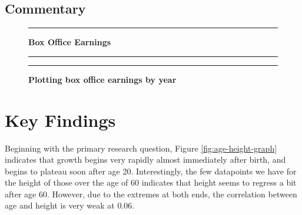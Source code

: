 \documentclass[]{article}
\begin{document}
\newpage

\subsection{Commentary}
\label{sec:summary-commentary}

\newpage

\begin{figure}[!ht]
    \hrule
    \caption{ \textbf{Box Office Earnings} }
    \begin{center}
    \end{center}
    \label{fig:hip-floor-graph}
  \hrule
  \vspace{2.5mm}
      \caption{\textbf{ Plotting box office earnings by year }   }
      \label{fig:combined}
  \vspace{-2.5mm}
  \hrule
\end{figure}

\newpage

\section{Key Findings}
\label{sec:findings}

Beginning with the primary research question, Figure
\ref{fig:age-height-graph} indicates that growth begins very rapidly
almost immediately after birth, and begins to plateau soon after age 20.
Interestingly, the few datapoints we have for the height of those over
the age of 60 indicates that height seems to regress a bit after age 60.
However, due to the extremes at both ends, the correlation between age
and height is very weak at 0.06.
\end{document}
